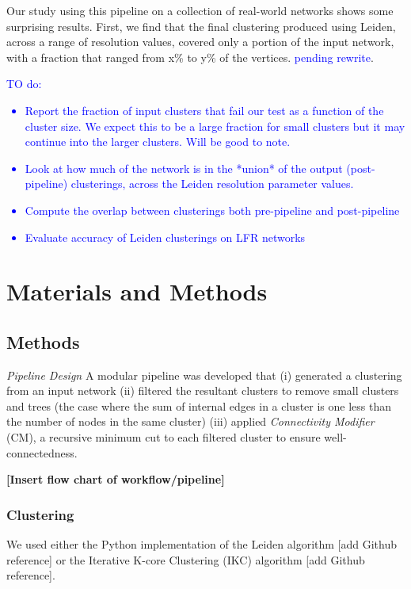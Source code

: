 \documentclass[12pt, oneside]{article}   	%
\begin{document}
Our study using this pipeline on a collection of real-world networks shows some surprising results. First, we find that the final clustering produced using Leiden, across a range of resolution values, 
covered only a portion of the input network, with a  fraction that ranged from x\% to y\% of the vertices. \textcolor{blue}{pending rewrite}.

\textcolor{blue}{TO do:
\begin{itemize}
\item Report the fraction of input clusters that fail our test as a function of the cluster size.
We expect this to be a large fraction for small clusters but it may continue into the larger clusters.
Will be good to note.
\item Look at how much of the network is in the *union* of the output (post-pipeline) clusterings, across the Leiden resolution parameter values.
\item Compute the overlap between clusterings both pre-pipeline and post-pipeline
\item  Evaluate accuracy of Leiden clusterings on LFR networks 
\end{itemize}
}

\section{Materials and Methods}

\subsection{Methods} 
\emph{Pipeline Design} A modular pipeline was developed that (i) generated a clustering from an input network (ii) filtered the resultant clusters to remove small clusters and trees (the case where the sum of internal edges in a cluster is one less than the number of nodes in the same cluster) (iii) applied \emph{Connectivity Modifier} (CM), a recursive minimum cut to each filtered cluster to ensure well-connectedness.

\vspace{5 mm}
\textbf{[Insert flow chart of workflow/pipeline]}

\subsubsection{Clustering} We used either the Python implementation of the Leiden algorithm [add Github reference] or the Iterative K-core Clustering (IKC) algorithm [add Github reference].
\end{document}
